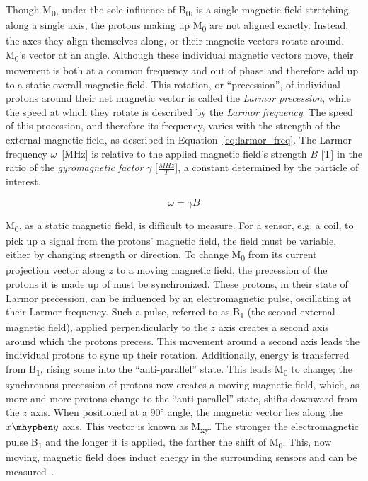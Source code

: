 Though M\textsubscript{0}, under the sole influence of B\textsubscript{0}, is a single magnetic field 
stretching along a single axis, the protons making up M\textsubscript{0} are not aligned 
exactly. Instead, the axes they align themselves along, or their magnetic 
vectors rotate around, M\textsubscript{0}'s vector at an angle. Although these individual 
magnetic vectors move, their movement is both at a common frequency and out of 
phase and therefore add up to a static overall magnetic field. This rotation,
or \enquote{precession}, of individual protons around their net magnetic vector
is called the \textit{Larmor precession}, while the speed at which they rotate
is described by the \textit{Larmor frequency}. The speed of this procession, and
therefore its frequency, varies with the strength of the external magnetic 
field, as described in Equation~\ref{eq:larmor_freq}. The Larmor frequency $\omega$~[MHz]
is relative to the applied magnetic field's strength $B$ [T] in the ratio of
the \textit{gyromagnetic factor} $\gamma$ [$\frac{MHz}{T}$], a constant determined by the 
particle of interest.


\begin{equation} \label{eq:larmor_freq}
    \omega = \gamma B
\end{equation}

M\textsubscript{0}, as a static magnetic field, is difficult to measure. For a sensor, e.g.
a coil, to pick up a signal from the protons' magnetic field, the field must be 
variable, either by changing strength or direction. To change M\textsubscript{0} from its 
current projection vector along $z$ to a moving magnetic field, the 
precession of the protons it is made up of must be synchronized. These protons,
in their state of Larmor precession, can be influenced by an electromagnetic 
pulse, oscillating at their Larmor frequency. Such a pulse, referred to as 
B\textsubscript{1} (the second external magnetic field), applied perpendicularly to the $z$ 
axis creates a second axis around which the protons precess. This movement 
around a second axis leads the individual protons to sync up their rotation.
Additionally, energy is transferred from B\textsubscript{1}, rising some into the 
\enquote{anti-parallel} state. This leads M\textsubscript{0} to change; the synchronous 
precession of protons now creates a moving magnetic field, which, as more and
more protons change to the \enquote{anti-parallel} state, shifts downward from
the $z$ axis. When positioned at a 90° angle, the magnetic vector lies along the 
$x\mhyphen y$ axis. This vector is known as M\textsubscript{xy}. The stronger the electromagnetic 
pulse B\textsubscript{1} and the longer it is applied, the farther the shift of M\textsubscript{0}. 
This, now moving, magnetic field does induct energy in the surrounding 
sensors and can be measured~\cite{medical_imaging,introduction_to_particle_physics,mri_the_basics}.

